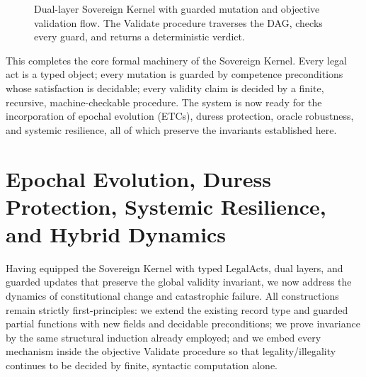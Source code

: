 \documentclass[11pt,a4paper]{article}
\begin{document}
\begin{figure}[h]
\centering
{}
\caption{Dual-layer Sovereign Kernel with guarded mutation and objective validation flow. The Validate procedure traverses the DAG, checks every guard, and returns a deterministic verdict.}
\end{figure}

This completes the core formal machinery of the Sovereign Kernel. Every legal act is a typed object; every mutation is guarded by competence preconditions whose satisfaction is decidable; every validity claim is decided by a finite, recursive, machine-checkable procedure. The system is now ready for the incorporation of epochal evolution (ETCs), duress protection, oracle robustness, and systemic resilience, all of which preserve the invariants established here.

\section{Epochal Evolution, Duress Protection, Systemic Resilience, and Hybrid Dynamics}

Having equipped the Sovereign Kernel with typed LegalActs, dual layers, and guarded updates that preserve the global validity invariant, we now address the dynamics of constitutional change and catastrophic failure. All constructions remain strictly first-principles: we extend the existing record type and guarded partial functions with new fields and decidable preconditions; we prove invariance by the same structural induction already employed; and we embed every mechanism inside the objective Validate procedure so that legality/illegality continues to be decided by finite, syntactic computation alone.
\end{document}
